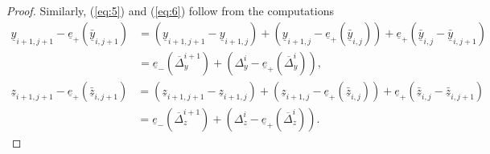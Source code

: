 \documentclass[a4paper]{article}
\numberwithin{equation}{section}
\begin{document}
\begin{proof}
Similarly, (\ref{eq:5}) and (\ref{eq:6}) follow from the computations
\begin{equation}
	\begin{split}
	\underline{y}_{i+1,j+1}-\underline{e}_+(\bar{\underline{y}}_{i,j+1})&=(\underline{y}_{i+1,j+1}-\underline{y}_{i+1,j})+\left(\underline{y}_{i+1,j}-\underline{e}_+(\bar{\underline{y}}_{i,j})\right)+\underline{e}_+(\bar{\underline{y}}_{i,j}-\bar{\underline{y}}_{i,j+1}) \\
	&=\underline{e}_-(\overline{\Delta}_y^{i+1})+\left(\Delta_y^i-\underline{e}_+(\overline{\Delta}_y^i)\right),
	\end{split}
\end{equation}
\begin{equation}
	\begin{split}
	\underline{z}_{i+1,j+1}-\underline{e}_+(\bar{\underline{z}}_{i,j+1})&=(\underline{z}_{i+1,j+1}-\underline{z}_{i+1,j})+\left(\underline{z}_{i+1,j}-\underline{e}_+(\bar{\underline{z}}_{i,j})\right)+\underline{e}_+(\bar{\underline{z}}_{i,j}-\bar{\underline{z}}_{i,j+1}) \\
	&=\underline{e}_-(\overline{\Delta}_z^{i+1})+\left(\Delta_z^i-\underline{e}_+(\overline{\Delta}_z^i)\right).
	\end{split}
\end{equation}


\end{proof}
\end{document}
